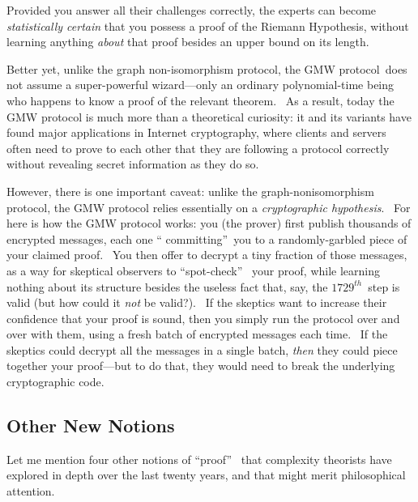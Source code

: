 \documentclass[11pt,onecolumn]{article}%
\begin{document}
Provided you answer all their challenges correctly, the experts can become
\textit{statistically certain} that you possess a proof of the Riemann
Hypothesis, without learning anything \textit{about} that proof besides an
upper bound on its length.

Better yet, unlike the graph non-isomorphism protocol, the GMW protocol\ does
not assume a super-powerful wizard---only an ordinary polynomial-time being
who happens to know a proof of the relevant theorem. \ As a result, today the
GMW protocol is much more than a theoretical curiosity: it and its variants
have found major applications in Internet cryptography, where clients and
servers often need to prove to each other that they are following a protocol
correctly without revealing secret information as they do so.

However, there is one important caveat: unlike the graph-nonisomorphism
protocol, the GMW protocol relies essentially on a \textit{cryptographic
hypothesis}. \ For here is how the GMW protocol works: you (the prover) first
publish thousands of encrypted messages, each one \textquotedblleft
committing\textquotedblright\ you to a randomly-garbled piece of your claimed
proof. \ You then offer to decrypt a tiny fraction of those messages, as a way
for skeptical observers to \textquotedblleft spot-check\textquotedblright%
\ your proof, while learning nothing about its structure besides the useless
fact that, say, the $1729^{th}$\ step is valid (but how could it \textit{not}
be valid?). \ If the skeptics want to increase their confidence that your
proof is sound, then you simply run the protocol over and over with them,
using a fresh batch of encrypted messages each time. \ If the skeptics could
decrypt all the messages in a single batch, \textit{then} they could piece
together your proof---but to do that, they would need to break the underlying
cryptographic code.

\subsection{Other New Notions\label{OTHERNEW}}

Let me mention four other notions of \textquotedblleft proof\textquotedblright%
\ that complexity theorists have explored in depth over the last twenty years,
and that might merit philosophical attention.
\end{document}
